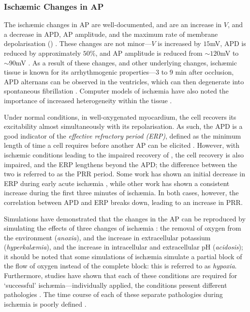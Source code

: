 \documentclass[../thesis-main.tex]{subfiles}
\begin{document}
\subsubsection{Isch\ae{}mic Changes in AP}
\label{subsubsec:ischaemia-ap}

The isch\ae{}mic changes in AP are well-documented, and are an increase in $V$, and a decrease in APD, AP amplitude, and the maximum rate of membrane depolarisation (\dvdtmax{}) \citep{Carmeliet1999, Weiss1982, Weiss1992, Kleber1987a, Barrett1997, Janse2001}. These changes are not minor---$V$ is increased by $15$mV, APD is reduced by approximately $50\%$, and AP amplitude is reduced from $\sim120$mV to $\sim90$mV \citep{Rodriguez2002}. As a result of these changes, and other underlying changes, isch\ae{}mic tissue is known for its arrhythmogenic properties---3 to 9 min after occlusion, APD alternans can be observed in the ventricles, which can then degenerate into spontaneous fibrillation \citep{Downar1977}. Computer models of isch\ae{}mia have also noted the importance of increased heterogeneity within the tissue \citep{Avitall1979, Behrens1997}.

Under normal conditions, in well-oxygenated myocardium, the cell recovers its excitability almost simultaneously with its repolarisation. As such, the APD is a good indicator of the \emph{effective refractory period (ERP)}, defined as the minimum length of time a cell requires before another AP can be elicited \citep{Huang2004}. However, with isch\ae{}mic conditions leading to the impaired recovery of \ina{}, the cell recovery is also impaired, and the ERP lengthens beyond the APD; the difference between the two is referred to as the PRR period. Some work has shown an initial decrease in ERP during early acute isch\ae{}mia \citep{Downar1977}, while other work has shown a consistent increase \citep{Sutton2000} during the first three minutes of isch\ae{}mia. In both cases, however, the correlation between APD and ERP breaks down, leading to an increase in PRR.

Simulations have demonstrated that the changes in the AP can be reproduced by simulating the effects of three changes of isch\ae{}mia \citep{Shaw1997, Shaw1997a, Ferrero1996, Rodriguez2004}: the removal of oxygen from the environment (\emph{anoxia}), and the increase in extracellular potassium (\emph{hyperkal\ae{}mia}), and the increase in intracellular and extracellular pH (\emph{acidosis}); it should be noted that some simulations of isch\ae{}mia simulate a partial block of the flow of oxygen instead of the complete block: this is referred to as \emph{hypoxia}. Furthermore, studies have shown that each of these conditions are required for `successful' isch\ae{}mia---individually applied, the conditions present different pathologies \citep{Rodriguez2006, Sharma1983}. The time course of each of these separate pathologies during isch\ae{}mia is poorly defined \citep{Niederer2013}.
\end{document}
